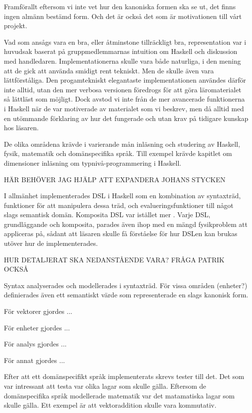 \begin{binge}
Framförallt eftersom vi inte vet hur den kanoniska formen ska se ut, det finns
ingen almänn bestämd form. Och det är också det som är motivationen till vårt
projekt. 

Vad som ansågs vara en bra, eller åtminstone tillräckligt bra, representation
var i huvudsak baserat på gruppmedlemmarnas intuition om Haskell och diskussion
med handledaren. Implementationerna skulle vara både naturliga, i den mening
att de gick att använda smidigt rent tekniskt. Men de skulle även vara
lättförståliga. Den progamtekniskt elegantaste implementationen användes därför
inte alltid, utan den mer verbosa versionen föredrogs för att göra
läromaterialet så lättläst som möjligt. Dock avstod vi inte från de mer
avancerade funktionerna i Haskell när de var motiverade av materialet som vi
beskrev, men då alltid med en utömmande förklaring av hur det fungerade och utan
krav på tidigare kunskap hos läsaren.

De olika områdena krävde i varierande mån inläsning och studering av Haskell,
fysik, matematik och domänspecifika språk. Till exempel krävde kapitlet om
dimensioner inläsning om typnivå-programmering i Haskell. 

HÄR BEHÖVER JAG HJÄLP ATT EXPANDERA JOHANS STYCKEN

I allmänhet implementerades DSL i Haskell som en kombination av syntaxträd,
funktioner för att manipulera dessa träd, och evalueringsfunktioner till något
slags semantisk domän. Komposita DSL var
istället mer . Varje DSL, grundläggande och komposita,
parades även ihop med en mängd fysikproblem att appliceras på, sådant att
läsaren skulle få förståelse för hur DSLen kan brukas utöver hur de
implementerades.

HUR DETALJERAT SKA NEDANSTÅENDE VARA? FRÅGA PATRIK OCKSÅ

Syntax analyserades och modellerades i syntaxträd. För vissa områden
(enheter?) definierades även ett semantiskt värde som representerade
en slags kanonisk form.

För vektorer gjordes ...

För enheter gjordes ...

För analys gjordes ...

För annat gjordes ...

Efter att ett domänspecifikt språk implementerats skrevs tester till det. Det som var intressant att testa var olika lagar som skulle gälla. Eftersom de domänspecifika språk modellerade matematik var det matamatiska lagar som skulle gälla. Ett exempel är att vektoraddition skulle vara kommutativ.


\end{binge}
